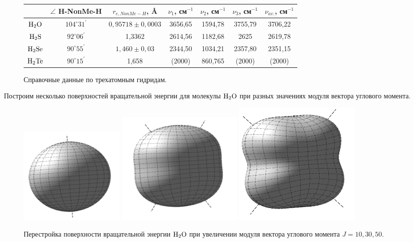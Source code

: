 \begin{figure}[H]
\begin{tabular}{|*7{c|}}  \hline
\rule[-2ex]{0pt}{6ex} & $\angle$ H-NonMe-H & $r_{e, NonMe-H}$, \AA & $\nu_1$, см$^{-1}$ & $\nu_2$, см$^{-1}$ & $\nu_3$, см$^{-1}$ & $\nu_{av.}$, см$^{-1}$  \\ \hline
\rule[-2ex]{0pt}{6ex} $\ce{H2O}$ & $104^\circ 31^{'}$ & $0,95718 \pm 0,0003$ & 3656,65 & 1594,78 & 3755,79 & 3706,22 \\ \hline
\rule[-2ex]{0pt}{6ex} $\ce{H2S}$ & $92^\circ 06^{'}$ & 1,3362 & 2614,56 & 1182,68 & 2625 & 2619,78 \\ \hline
\rule[-2ex]{0pt}{6ex} $\ce{H2Se}$ & $90^\circ 55^{'}$ & $1,460 \pm 0,03$ & 2344,50 & 1034,21 & 2357,80 & 2351,15 \\ \hline
\rule[-2ex]{0pt}{6ex} $\ce{H2Te}$ & $90^\circ 15^{'}$ & 1,658 & (2000) & 860,765 & (2000) & (2000) \\ \hline
\end{tabular}
\caption{Справочные данные по трехатомным гидридам.}
\label{table1}
\end{figure}

Построим несколько поверхностей вращательной энергии для молекулы $\ce{H2O}$ при разных значениях модуля вектора углового момента. 

\begin{figure}[H]
  \centering
	\includegraphics[width=0.25\textwidth]{../pictures/Rigid_RES_10.png}
	\includegraphics[width=0.3\textwidth]{../pictures/Rigid_RES_30.png}
	\includegraphics[width=0.3\textwidth]{../pictures/Rigid_RES_50.png}
	\caption{Перестройка поверхности вращательной энергии $\ce{H2O}$ при увеличении модуля вектора углового момента $J=10, 30, 50$.}
	\label{fig:triatomic}
\end{figure}

